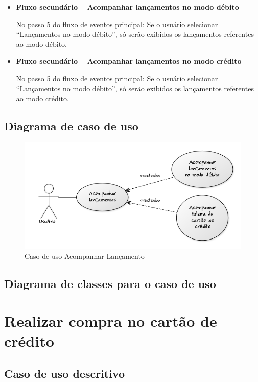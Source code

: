 \begin{itemize}
  \item \textbf{Fluxo secundário – Acompanhar lançamentos no modo débito}

  No passo 5 do fluxo de eventos principal:
  \subitem Se o usuário selecionar ``Lançamentos no modo débito'', só serão exibidos os lançamentos referentes ao modo débito.

  \item \textbf{Fluxo secundário – Acompanhar lançamentos no modo crédito}

  No passo 5 do fluxo de eventos principal:
  \subitem Se o usuário selecionar ``Lançamentos no modo débito'', só serão exibidos os lançamentos referentes ao modo crédito.
\end{itemize}

\subsection{Diagrama de caso de uso}

\begin{figure}[!htb]
     \centering
     \includegraphics[scale=0.6]{diagramas/caso-de-uso/imagens/acompanharLancamento.png}
     \caption{Caso de uso Acompanhar Lançamento}
\end{figure}

\subsection{Diagrama de classes para o caso de uso}

\section{Realizar compra no cartão de crédito}

\subsection{Caso de uso descritivo}

